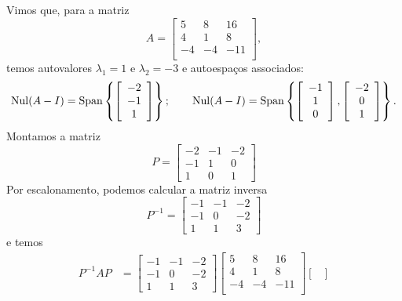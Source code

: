 \documentclass[../livro.tex]{subfiles}  %
\begin{document}
\begin{example}\label{exp:3x3denovo}
	Vimos que, para a matriz
	\[
	A =
	\left[
	\begin{array}{ccc}
	5 & 8 & 16 \\
	4 & 1 & 8 \\
	-4 & -4 & -11 \\
	\end{array}
	\right],
	\] temos autovalores $\lambda_1 = 1$ e $\lambda_2 = -3$ e autoespaços associados:
	\[
	\operatorname{Nul} (A - I) = \operatorname{Span} \left\{ \left[
	\begin{array}{c}
	-2 \\
	-1 \\
	1 \\
	\end{array}
	\right] \right\}; \qquad \operatorname{Nul} (A - I) = \operatorname{Span} \left\{ \left[
	\begin{array}{c}
	-1 \\
	1 \\
	0 \\
	\end{array}
	\right], \left[
	\begin{array}{ccc}
	-2 \\
	0 \\
	1 \\
	\end{array}
	\right] \right\}.
	\] Montamos a matriz
	\[
	P =
	\begin{bmatrix}
	-2&-1&-2 \\ -1&1&0 \\ 1&0&1
	\end{bmatrix}
	\] Por escalonamento, podemos calcular a matriz inversa
	\[
	P^{-1} =
	\begin{bmatrix}
	-1&-1&-2 \\ -1&0&-2 \\ 1&1&3
	\end{bmatrix}
	\] e temos
          \begin{align*}
	P^{-1} A P & =
	\begin{bmatrix}
	-1&-1&-2 \\ -1&0&-2 \\ 1&1&3
	\end{bmatrix}
	\begin{bmatrix}
	5 & 8 & 16 \\ 4 & 1 & 8 \\ -4 & -4 & -11 \\
	\end{bmatrix}
	\begin{bmatrix}

\end{bmatrix}
\end{align*}
\end{example}
\end{document}
